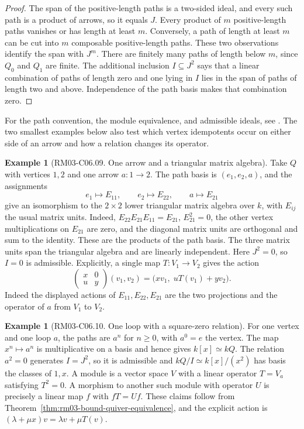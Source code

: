 \documentclass[11pt,oneside,openany]{book}
\theoremstyle{definition}
\newtheorem{example}[theorem]{Example}
\theoremstyle{remark}
\begin{document}
\begin{proof}
The span of the positive-length paths is a two-sided ideal, and
every such path is a product of arrows, so it equals \(J\).
Every product of \(m\) positive-length paths vanishes or has
length at least \(m\). Conversely, a path of length at least \(m\)
can be cut into \(m\) composable positive-length paths. These two
observations identify the span with \(J^m\). There are finitely
many paths of length below \(m\), since \(Q_0\) and \(Q_1\) are
finite. The additional inclusion \(I\subseteq J^2\) says that a
linear combination of paths of length zero and one lying in \(I\)
lies in the span of paths of length two and above. Independence
of the path basis makes that combination zero.
\end{proof}

For the path convention, the module equivalence, and admissible
ideals, see \cite[Secs.~1.3--1.4]{quiver}. The two smallest
examples below also test which vertex idempotents occur on
either side of an arrow and how a relation changes its operator.

\begin{example}[RM03-C06.09. One arrow and a triangular matrix algebra]
\label{ex:rm03-one-arrow}
Take \(Q\) with vertices \(1,2\) and one arrow \(a\colon 1\to 2\).
The path basis is \((e_1,e_2,a)\), and the assignments
\[
 e_1\longmapsto E_{11},\qquad
 e_2\longmapsto E_{22},\qquad
 a\longmapsto E_{21}
\]
give an isomorphism to the \(2\times 2\) lower triangular
matrix algebra over \(k\), with \(E_{ij}\) the usual matrix
units. Indeed, \(E_{22}E_{21}E_{11}=E_{21}\),
\(E_{21}^2=0\), the other vertex multiplications on \(E_{21}\)
are zero, and the diagonal matrix units are orthogonal and
sum to the identity. These are the products of the path basis.
The three matrix units span the triangular algebra and are linearly
independent. Here \(J^2=0\), so \(I=0\) is admissible.
Explicitly, a single map \(T\colon V_1\to V_2\) gives the action
\[
 \begin{pmatrix}x&0\\ u&y\end{pmatrix}(v_1,v_2)
   =\bigl(xv_1,\;uT(v_1)+yv_2\bigr).
\]
Indeed the displayed actions of \(E_{11},E_{22},E_{21}\) are the
two projections and the operator of \(a\) from \(V_1\) to \(V_2\).
\end{example}

\begin{example}[RM03-C06.10. One loop with a square-zero relation]
\label{ex:rm03-square-zero-loop}
For one vertex and one loop \(a\), the paths are \(a^n\)
for \(n\geq 0\), with \(a^0=e\) the vertex. The map
\(x^n\mapsto a^n\) is multiplicative on a basis and hence gives
\(k[x]\simeq kQ\). The relation \(a^2=0\) generates \(I=J^2\),
so it is admissible and \(kQ/I\simeq k[x]/(x^2)\) has basis
the classes of \(1,x\). A module is a vector space \(V\) with a
linear operator \(T=V_a\) satisfying \(T^2=0\). A morphism to
another such module with operator \(U\) is precisely a linear
map \(f\) with \(fT=Uf\). These claims follow from
Theorem~\ref{thm:rm03-bound-quiver-equivalence}, and the explicit
action is \((\lambda+\mu x)v=\lambda v+\mu T(v)\).
\end{example}
\end{document}
